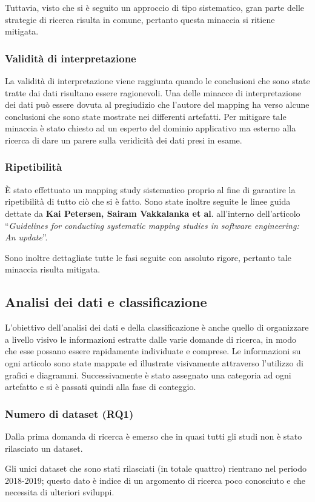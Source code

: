 Tuttavia, visto che si è seguito un approccio di tipo sistematico, gran parte delle
strategie di ricerca risulta in comune, pertanto questa minaccia si ritiene mitigata.
\subsubsection{Validità di interpretazione}
La validità di interpretazione viene raggiunta quando le conclusioni che sono state tratte dai dati risultano essere ragionevoli. Una delle minacce di interpretazione dei dati può essere dovuta al pregiudizio che l’autore del mapping ha verso alcune conclusioni che sono state mostrate nei differenti artefatti. Per mitigare tale minaccia è stato chiesto ad un esperto del dominio applicativo ma esterno alla ricerca di dare un parere sulla veridicità dei dati presi in esame.
\subsubsection{Ripetibilità}
È stato effettuato un mapping study sistematico proprio al fine di garantire la ripetibilità di tutto ciò che si è fatto. Sono state inoltre seguite le linee guida dettate
da \textbf{Kai Petersen, Sairam Vakkalanka et al}. all’interno dell’articolo “\emph{Guidelines
for conducting systematic mapping studies in software engineering: An update}”.

Sono inoltre dettagliate tutte le fasi seguite con assoluto rigore, pertanto tale minaccia risulta mitigata.
\subsection{Analisi dei dati e classificazione}
L’obiettivo dell’analisi dei dati e della classificazione è anche quello di organizzare a livello visivo le informazioni estratte dalle varie domande di ricerca,
in modo che esse possano essere rapidamente individuate e comprese. Le informazioni su ogni articolo sono state mappate ed illustrate visivamente attraverso l’utilizzo di grafici e diagrammi. Successivamente è stato assegnato una categoria ad ogni artefatto e si è passati quindi alla fase di conteggio.
\subsubsection{Numero di dataset (RQ1)}
Dalla prima domanda di ricerca è emerso che in quasi tutti gli studi non è
stato rilasciato un dataset.

Gli unici dataset che sono stati rilasciati (in totale quattro) rientrano nel periodo 2018-2019; questo dato è indice di un argomento di ricerca poco conosciuto e che necessita di ulteriori sviluppi.


